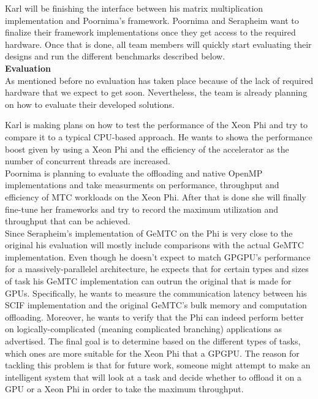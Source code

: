\documentclass[10pt, conference, compsocconf]{IEEEtran}
\begin{document}
Karl will be finishing the interface between his matrix multiplication
implementation and Poornima's framework. Poornima and Serapheim want to
finalize their framework implementations once they get access to the
required hardware. Once that is done, all team members will quickly
start evaluating their designs and run the different benchmarks described
below.\\


\textbf{Evaluation}\\

As mentioned before no evaluation has taken place because of the
lack of required hardware that we expect to get soon. Nevertheless,
the team is already planning on how to evaluate their developed
solutions.\\

\newpage

Karl is making plans on how to test the performance
of the Xeon Phi and try to compare it to a typical CPU-based
approach. He wants to showa the performance boost given by using
a Xeon Phi and the efficiency of the accelerator as the number
of concurrent threads are increased.\\

Poornima is planning to evaluate the offloading and native OpenMP
implementations and take measurments on performance, throughput
and efficiency of MTC workloads on the Xeon Phi. After that is
done she will finally fine-tune her frameworks and try to record
the maximum utilization and throughput that can be achieved.\\

Since Serapheim's implementation of GeMTC on the Phi is very close
to the original his evaluation will mostly include comparisons with
the actual GeMTC implementation. Even though he doesn't expect to
match GPGPU's performance for a massively-parallelel architecture,
he expects that for certain types and sizes of task his GeMTC implementation
can outrun the original that is made for GPUs. Specifically,
he wants to measure the communication latency between his SCIF
implementation and the original GeMTC's bulk memory and computation
offloading. Moreover, he wants to verify that the Phi can indeed
perform better on logically-complicated (meaning complicated branching)
applications as advertised. The final goal is to determine based
on the different types of tasks, which ones are more suitable for
the Xeon Phi that a GPGPU. The reason for tackling this problem
is that for future work, someone might attempt to make an intelligent
system that will look at a task and decide whether to offload it on
a GPU or a Xeon Phi in order to take the maximum throughput.\\
\end{document}
